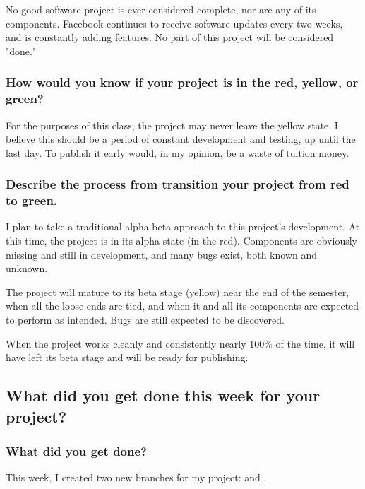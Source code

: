 \documentclass[letterpaper]{article}            %
\begin{document}
No good software project is ever considered complete, nor are any of its components. Facebook continues to receive software updates every two weeks, and is constantly adding features. No part of this project will be considered "done."

\subsubsection{How would you know if your project is in the red, yellow, or green?}

For the purposes of this class, the project may never leave the yellow state. I believe this should be a period of constant development and testing, up until the last day. To publish it early would, in my opinion, be a waste of tuition money.

\subsubsection{Describe the process from transition your project from red to green.}

I plan to take a traditional alpha-beta approach to this project's development. At this time, the project is in its alpha state (in the red). Components are obviously missing and still in development, and many bugs exist, both known and unknown.

The project will mature to its beta stage (yellow) near the end of the semester, when all the loose ends are tied, and when it and all its components are expected to perform as intended. Bugs are still expected to be discovered.

When the project works cleanly and consistently nearly 100\% of the time, it will have left its beta stage and will be ready for publishing.


\subsection{What did you get done this week for your project?}

\subsubsection{What did you get done?}

This week, I created two new branches for my project:  and . 
\end{document}
